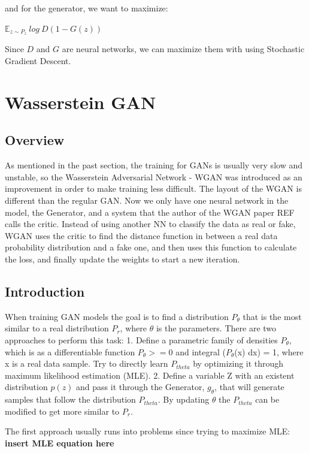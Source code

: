 \documentclass{article}
\begin{document}
and for the generator, we want to maximize:

\begin{center}
	$\mathbb{E}_{z \sim P_z}~log~D(1-G(z))$
\end{center}

Since $D$ and $G$ are neural networks, we can maximize them with using Stochastic Gradient Descent. 

\section{Wasserstein GAN}

\subsection{Overview}
As mentioned in the past section, the training for GANs is usually very slow and unstable, so the Wasserstein Adversarial Network - WGAN was introduced as an improvement in order to make training less difficult. The layout of the WGAN is different than the regular GAN. Now we only have one neural network in the model, the Generator, and a system that the author of the WGAN paper REF calls the critic. Instead of using another NN to classify the data as real or fake, WGAN uses the critic to find the distance function in between a real data probability distribution and a fake one, and then uses this function to calculate the loss, and finally update the weights to start a new iteration.

\subsection{Introduction}
When training GAN models the goal is to find a distribution $P_{\theta}$ that is the most similar to a real distribution $P_{r}$, where $\theta$ is the parameters. There are two approaches to perform this task:
1. Define a parametric family of densities $P_{\theta}$, which is as a differentiable function $P_{\theta} >= 0$ and integral ($P_{\theta}$(x) dx) = 1, where x is a real data sample. Try to directly learn $P_{theta}$ by optimizing it through maximum likelihood estimation (MLE).
2. Define a variable Z with an existent distribution $p(z)$ and pass it through the Generator, $g_{\theta}$, that will generate samples that follow the distribution $P_{theta}$. By updating $\theta$ the $P_{theta}$ can be modified to get more similar to $P_{r}$.

The first approach usually runs into problems since trying to maximize MLE:
\textbf{insert MLE equation here}
\end{document}
